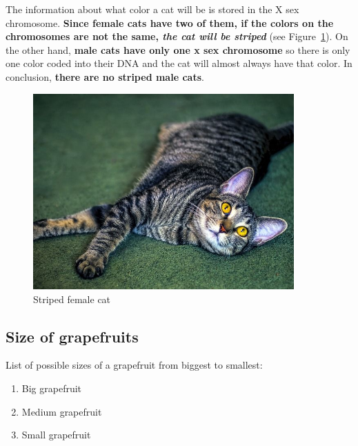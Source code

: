 The information about what color a cat will be is stored in the X sex chromosome. \textbf{Since female cats have two of them, if the colors on the chromosomes are not the same, \emph{the cat will be striped}} (see Figure~\ref{fig:cat}). On the other hand, \textbf{male cats have only one x sex chromosome} so there is only one color coded into their DNA and the cat will almost always have that color. In conclusion, \textbf{there are no striped male cats}.

\begin{figure}[t]
    \includegraphics[width=10cm]{pictures/SzymonJ/cat.jpg}
    \centering
    \caption{Striped female cat}
    \label{fig:cat}
\end{figure}

\newpage
\subsection{Size of grapefruits}
List of possible sizes of a grapefruit from biggest to smallest:
\begin{enumerate}
    \item Big grapefruit
    \item Medium grapefruit
    \item Small grapefruit
\end{enumerate}